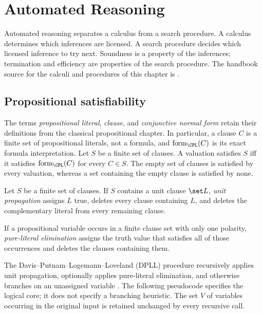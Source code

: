 \chapter{Automated Reasoning}
\label{ch:automated-reasoning}

Automated reasoning separates a calculus from a search procedure.  A calculus
determines which inferences are licensed.  A search procedure decides which
licensed inference to try next.  Soundness is a property of the inferences;
termination and efficiency are properties of the search procedure.  The
handbook source for the calculi and procedures of this chapter is
\cite{RobinsonVoronkov2001}.

\section{Propositional satisfiability}
\label{sec:automated-reasoning-01}

The terms \emph{propositional literal}, \emph{clause}, and
\emph{conjunctive normal form} retain their definitions from the classical
propositional chapter.  In particular, a clause \(C\) is a finite set of
propositional literals, not a formula, and
\(\operatorname{form}_{\CPL}(C)\) is its exact formula interpretation.  Let
\(S\) be a finite set of clauses.  A valuation satisfies \(S\) iff it
satisfies \(\operatorname{form}_{\CPL}(C)\) for every \(C\in S\).  The empty
set of clauses is satisfied by every valuation, whereas a set containing the
empty clause is satisfied by none.

\begin{definition}
Let \(S\) be a finite set of clauses.  If \(S\) contains a unit clause
\(\set L\), \emph{unit propagation} assigns \(L\) true, deletes every clause
containing \(L\), and deletes the complementary literal from every remaining
clause.
\end{definition}

\begin{definition}
If a propositional variable occurs in a finite clause set with only one
polarity, \emph{pure-literal elimination} assigns the truth value that
satisfies all of those occurrences and deletes the clauses containing them.
\end{definition}

The Davis--Putnam--Logemann--Loveland (DPLL) procedure recursively applies
unit
propagation, optionally applies pure-literal elimination, and otherwise branches
on an unassigned variable \cite{DavisPutnam1960,DavisLogemannLoveland1962}.
The following pseudocode specifies the logical core; it does not specify a
branching heuristic.  The set \(V\) of variables occurring in the original
input is retained unchanged by every recursive call.

